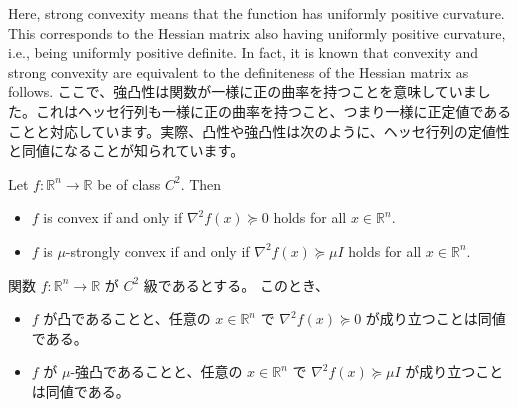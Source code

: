 \documentclass[0_main]{subfiles}
\begin{document}
\ifEn
    Here, strong convexity means that the function has uniformly positive curvature. This corresponds to the Hessian matrix also having uniformly positive curvature, i.e., being uniformly positive definite. In fact, it is known that convexity and strong convexity are equivalent to the definiteness of the Hessian matrix as follows.
\else
    ここで、強凸性は関数が一様に正の曲率を持つことを意味していました。これはヘッセ行列も一様に正の曲率を持つこと、つまり一様に正定値であることと対応しています。実際、凸性や強凸性は次のように、ヘッセ行列の定値性と同値になることが知られています。
\fi
\begin{proposition}\label{prop:convexity-hessian}
    \ifEn
        Let $f \colon \mathbb{R}^n \to \mathbb{R}$ be of class $C^2$. Then
        \begin{itemize}
            \item $f$ is convex if and only if $\nabla^2 f(x)\succeq0$ holds for all $x \in \mathbb{R}^n$.
            \item $f$ is $\mu$-strongly convex if and only if $\nabla^2 f(x)\succeq\mu I$ holds for all $x \in \mathbb{R}^n$.
        \end{itemize}
    \else
        関数 $f \colon \mathbb{R}^n \to \mathbb{R}$ が $C^2$ 級であるとする。
        このとき、
        \begin{itemize}
            \item $f$ が凸であることと、任意の $x \in \mathbb{R}^n$ で $\nabla^2 f(x)\succeq0$ が成り立つことは同値である。
            \item $f$ が $\mu$-強凸であることと、任意の $x \in \mathbb{R}^n$ で $\nabla^2 f(x)\succeq\mu I$ が成り立つことは同値である。
        \end{itemize}
    \fi
\end{proposition}
\end{document}
